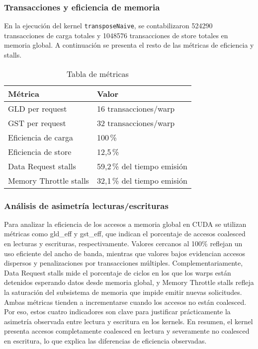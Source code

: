 \documentclass[a4paper,11pt]{article}
\begin{document}


\subsubsection{Transacciones y eficiencia de memoria}
En la ejecución del kernel \texttt{transposeNaive}, se contabilizaron \num{524290} transacciones de carga totales y \num{1048576} transacciones de store totales en memoria global. A continuación se presenta el resto de las métricas de eficiencia y stalls.

\begin{table}[H]
    \centering
    \caption{Tabla de métricas}
    \begin{tabular}{@{}ll@{}}
        \toprule
        \textbf{Métrica}                  & \textbf{Valor}                       \\ \midrule
        GLD per request                   & 16 transacciones/warp               \\
        GST per request                   & 32 transacciones/warp               \\
        Eficiencia de carga               & 100\,\%                             \\
        Eficiencia de store               & 12,5\,\%                            \\
        Data Request stalls               & 59,2\,\% del tiempo emisión         \\
        Memory Throttle stalls            & 32,1\,\% del tiempo emisión                            \\ \bottomrule
    \end{tabular}
\end{table}

\subsubsection*{Análisis de asimetría lecturas/escrituras}
Para analizar la eficiencia de los accesos a memoria global en CUDA se utilizan métricas como gld\_eff y gst\_eff, que indican el porcentaje de accesos coalesced en lecturas y escrituras, respectivamente. Valores cercanos al 100\% reflejan un uso eficiente del ancho de banda, mientras que valores bajos evidencian accesos dispersos y penalizaciones por transacciones múltiples. Complementariamente, Data Request stalls mide el porcentaje de ciclos en los que los warps están detenidos esperando datos desde memoria global, y Memory Throttle stalls refleja la saturación del subsistema de memoria que impide emitir nuevas solicitudes. Ambas métricas tienden a incrementarse cuando los accesos no están coalesced. Por eso, estos cuatro indicadores son clave para justificar prácticamente la asimetría observada entre lectura y escritura en los kernels. En resumen, el kernel presenta accesos completamente coalesced en lectura y severamente no coalesced en escritura, lo que explica las diferencias de eficiencia observadas.
    
\end{document}
